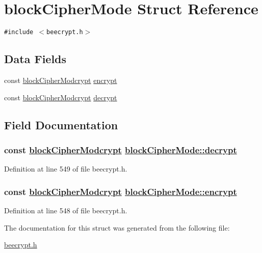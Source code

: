 \hypertarget{structblockCipherMode}{
\section{block\-Cipher\-Mode Struct Reference}
\label{structblockCipherMode}
}
{\tt \#include $<$beecrypt.h$>$}

\subsection*{Data Fields}
\begin{CompactItemize}
\item 
const \hyperlink{group__BC__m_ga4}{block\-Cipher\-Modcrypt} \hyperlink{structblockCipherMode_o0}{encrypt}
\item 
const \hyperlink{group__BC__m_ga4}{block\-Cipher\-Modcrypt} \hyperlink{structblockCipherMode_o1}{decrypt}
\end{CompactItemize}


\subsection{Field Documentation}
\hypertarget{structblockCipherMode_o1}{
\subsubsection[decrypt]{\setlength{\rightskip}{0pt plus 5cm}const \hyperlink{group__BC__m_ga4}{block\-Cipher\-Modcrypt} \hyperlink{structblockCipherMode_o1}{block\-Cipher\-Mode::decrypt}}}
\label{structblockCipherMode_o1}


Definition at line 549 of file beecrypt.h.\hypertarget{structblockCipherMode_o0}{
\subsubsection[encrypt]{\setlength{\rightskip}{0pt plus 5cm}const \hyperlink{group__BC__m_ga4}{block\-Cipher\-Modcrypt} \hyperlink{structblockCipherMode_o0}{block\-Cipher\-Mode::encrypt}}}
\label{structblockCipherMode_o0}


Definition at line 548 of file beecrypt.h.

The documentation for this struct was generated from the following file:\begin{CompactItemize}
\item 
\hyperlink{beecrypt_8h}{beecrypt.h}\end{CompactItemize}
